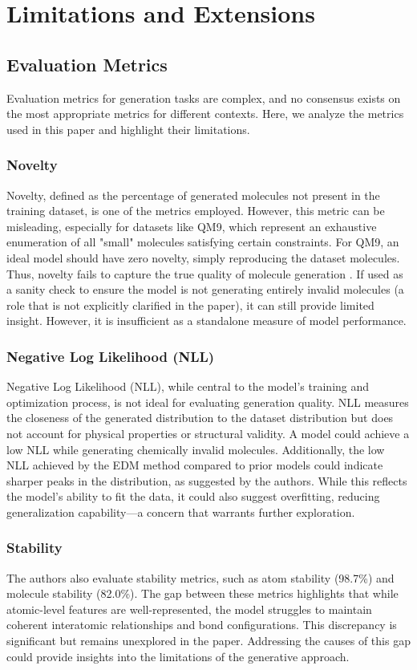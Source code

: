 \documentclass[sigconf]{acmart}
\begin{document}
\section{Limitations and Extensions}
\subsection{Evaluation Metrics}
Evaluation metrics for generation tasks are complex, and no consensus exists on the most appropriate metrics for different contexts. Here, we analyze the metrics used in this paper and highlight their limitations.

\subsubsection{Novelty}
Novelty, defined as the percentage of generated molecules not present in the training dataset, is one of the metrics employed. However, this metric can be misleading, especially for datasets like QM9, which represent an exhaustive enumeration of all "small" molecules satisfying certain constraints. For QM9, an ideal model should have zero novelty, simply reproducing the dataset molecules. Thus, novelty fails to capture the true quality of molecule generation \cite{vignac2022topnequivariantsetgraph}. If used as a sanity check to ensure the model is not generating entirely invalid molecules (a role that is not explicitly clarified in the paper), it can still provide limited insight. However, it is insufficient as a standalone measure of model performance.

\subsubsection{Negative Log Likelihood (NLL)}
Negative Log Likelihood (NLL), while central to the model’s training and optimization process, is not ideal for evaluating generation quality. NLL measures the closeness of the generated distribution to the dataset distribution but does not account for physical properties or structural validity. A model could achieve a low NLL while generating chemically invalid molecules. Additionally, the low NLL achieved by the EDM method compared to prior models could indicate sharper peaks in the distribution, as suggested by the authors. While this reflects the model's ability to fit the data, it could also suggest overfitting, reducing generalization capability—a concern that warrants further exploration.

\subsubsection{Stability}
The authors also evaluate stability metrics, such as atom stability (98.7\%) and molecule stability (82.0\%). The gap between these metrics highlights that while atomic-level features are well-represented, the model struggles to maintain coherent interatomic relationships and bond configurations. This discrepancy is significant but remains unexplored in the paper. Addressing the causes of this gap could provide insights into the limitations of the generative approach.
\end{document}
